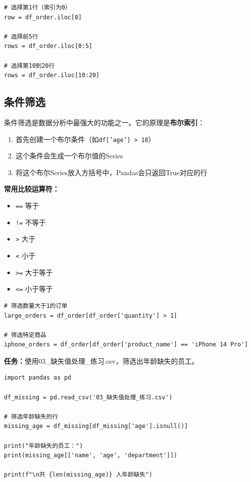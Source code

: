 \documentclass[12pt,a4paper]{article}
\begin{document}
\begin{lstlisting}[caption={使用iloc选择行}]
# 选择第1行（索引为0）
row = df_order.iloc[0]

# 选择前5行
rows = df_order.iloc[0:5]

# 选择第10到20行
rows = df_order.iloc[10:20]
\end{lstlisting}

\subsection{条件筛选}

\begin{theorybox}[布尔索引]
条件筛选是数据分析中最强大的功能之一。它的原理是\textbf{布尔索引}：

\begin{enumerate}
    \item 首先创建一个布尔条件（如\texttt{df['age'] > 18}）
    \item 这个条件会生成一个布尔值的Series
    \item 将这个布尔Series放入方括号中，Pandas会只返回True对应的行
\end{enumerate}

\textbf{常用比较运算符：}
\begin{itemize}
    \item \texttt{==} 等于
    \item \texttt{!=} 不等于
    \item \texttt{>} 大于
    \item \texttt{<} 小于
    \item \texttt{>=} 大于等于
    \item \texttt{<=} 小于等于
\end{itemize}
\end{theorybox}

\begin{lstlisting}[caption={条件筛选示例}]
# 筛选数量大于1的订单
large_orders = df_order[df_order['quantity'] > 1]

# 筛选特定商品
iphone_orders = df_order[df_order['product_name'] == 'iPhone 14 Pro']
\end{lstlisting}

\begin{practicebox}
\textbf{任务：}使用03\_缺失值处理\_练习.csv，筛选出年龄缺失的员工。

\begin{lstlisting}
import pandas as pd

df_missing = pd.read_csv('03_缺失值处理_练习.csv')

# 筛选年龄缺失的行
missing_age = df_missing[df_missing['age'].isnull()]

print("年龄缺失的员工：")
print(missing_age[['name', 'age', 'department']])

print(f"\n共 {len(missing_age)} 人年龄缺失")
\end{lstlisting}
\end{practicebox}
\end{document}
